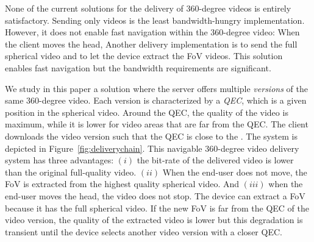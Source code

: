 None of the current solutions for the delivery of 360-degree videos is entirely
satisfactory. Sending only  videos is the least bandwidth-hungry implementation. However, it does
not enable fast
navigation within the 360-degree video: When the client moves the head, 
Another delivery implementation is to send the full spherical video
and to let the device
extract the \ac{FoV} videos. This solution enables fast navigation but the bandwidth requirements are
significant.

We study in this paper a solution where the server offers multiple \emph{versions} of the same
360-degree video. Each version is characterized by a \emph{\ac{QEC}}, which is a given
position in the spherical video. Around the \ac{QEC}, the quality of the video is maximum,
while it is lower for video areas that are far from the \ac{QEC}.
The client downloads the video version
such that
the \ac{QEC} is close to the .
The system is depicted in Figure~\ref{fig:deliverychain}.
This navigable 360-degree video delivery system has three advantages:
$(i)$ the bit-rate of the delivered video is lower than the original full-quality video.
$(ii)$ When the end-user does not move, the \ac{FoV}  is extracted from the highest
quality spherical video.
And $(iii)$ when the end-user moves the head, the video does not stop. The device can
extract
a  \ac{FoV}  because it has the full spherical video. If the new \ac{FoV}  is far from the
\ac{QEC} of the video version, the quality of the extracted video is lower but this
degradation is transient until the
device selects another video version with a closer \ac{QEC}.



